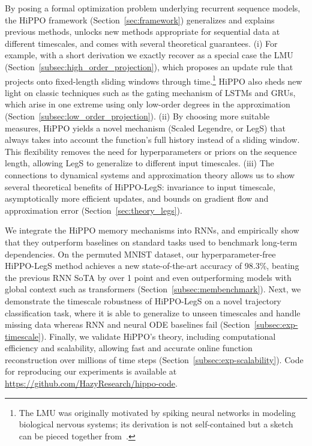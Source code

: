 \documentclass{article}
\begin{document}
  By posing a formal optimization problem underlying recurrent sequence models,
  the HiPPO framework (Section~\ref{sec:framework})
  generalizes and explains previous methods, unlocks new methods
  appropriate for sequential data at different timescales, and comes with several theoretical guarantees.
  (i) For example, with a short derivation we exactly recover as a special case
  the LMU~\citep{voelker2019legendre} (Section~\ref{subsec:high_order_projection}), which proposes an update rule that projects
  onto fixed-length sliding windows through time.\footnote{The LMU was originally motivated by spiking neural networks in
    modeling biological nervous systems; its derivation is not self-contained but a
    sketch can be pieced together from~\citep{voelker2019legendre,voelker2018improving,voelker2019dynamical}.}
  HiPPO also sheds new light on classic techniques such as the gating mechanism
  of LSTMs and GRUs, which arise in one extreme using only low-order degrees in
  the approximation (Section~\ref{subsec:low_order_projection}).
  (ii)
    By choosing more suitable measures, HiPPO yields a novel mechanism (Scaled Legendre, or LegS) that
    always takes into account the function's full history instead of a sliding window.
    This flexibility removes the need for hyperparameters or priors on the sequence length,
    allowing LegS to generalize to different input timescales.
    (iii)
    The connections to dynamical systems and approximation theory
    allows us to show several theoretical benefits of HiPPO-LegS:
    invariance to input timescale, asymptotically more efficient updates, and
    bounds on gradient flow and approximation error (Section~\ref{sec:theory_legs}).
    

  We integrate the HiPPO memory mechanisms into RNNs, and empirically show that they outperform baselines on standard tasks used to benchmark long-term dependencies.
  On the permuted MNIST dataset, our hyperparameter-free HiPPO-LegS method achieves a new state-of-the-art
  accuracy of 98.3\%,
  beating the previous RNN SoTA by over 1 point and even outperforming models
  with global context such as transformers (Section~\ref{subsec:membenchmark}).
  Next, we demonstrate the timescale robustness of HiPPO-LegS on a novel
  trajectory classification task, where it is able to generalize to unseen
  timescales and handle missing data whereas RNN and neural ODE baselines fail
  (Section~\ref{subsec:exp-timescale}).
  Finally, we validate HiPPO's theory, including computational efficiency and
  scalability, allowing fast and accurate online function reconstruction over
  millions of time steps (Section~\ref{subsec:exp-scalability}).
  Code for reproducing our experiments is available at \url{https://github.com/HazyResearch/hippo-code}.
\end{document}
